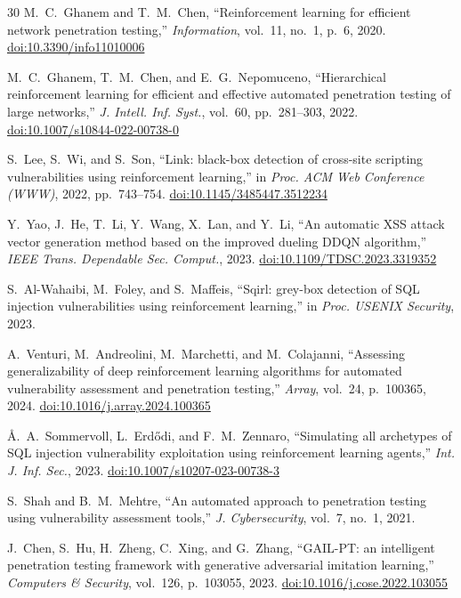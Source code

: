 \documentclass[a4paper,12pt]{article}
\begin{document}
\begin{thebibliography}{30}
 M.~C.~Ghanem and T.~M.~Chen, ``Reinforcement learning for efficient network penetration testing,'' \emph{Information}, vol.~11, no.~1, p.~6, 2020. \href{https://doi.org/10.3390/info11010006}{doi:10.3390/info11010006}

 M.~C.~Ghanem, T.~M.~Chen, and E.~G.~Nepomuceno, ``Hierarchical reinforcement learning for efficient and effective automated penetration testing of large networks,'' \emph{J. Intell. Inf. Syst.}, vol.~60, pp.~281--303, 2022. \href{https://doi.org/10.1007/s10844-022-00738-0}{doi:10.1007/s10844-022-00738-0}

 S.~Lee, S.~Wi, and S.~Son, ``Link: black-box detection of cross-site scripting vulnerabilities using reinforcement learning,'' in \emph{Proc. ACM Web Conference (WWW)}, 2022, pp.~743--754. \href{https://doi.org/10.1145/3485447.3512234}{doi:10.1145/3485447.3512234}

 Y.~Yao, J.~He, T.~Li, Y.~Wang, X.~Lan, and Y.~Li, ``An automatic XSS attack vector generation method based on the improved dueling DDQN algorithm,'' \emph{IEEE Trans. Dependable Sec. Comput.}, 2023. \href{https://doi.org/10.1109/TDSC.2023.3319352}{doi:10.1109/TDSC.2023.3319352}

 S.~Al-Wahaibi, M.~Foley, and S.~Maffeis, ``Sqirl: grey-box detection of SQL injection vulnerabilities using reinforcement learning,'' in \emph{Proc. USENIX Security}, 2023.

 A.~Venturi, M.~Andreolini, M.~Marchetti, and M.~Colajanni, ``Assessing generalizability of deep reinforcement learning algorithms for automated vulnerability assessment and penetration testing,'' \emph{Array}, vol.~24, p.~100365, 2024. \href{https://doi.org/10.1016/j.array.2024.100365}{doi:10.1016/j.array.2024.100365}

 {\AA}.~A.~Sommervoll, L.~Erd{\H o}di, and F.~M.~Zennaro, ``Simulating all archetypes of SQL injection vulnerability exploitation using reinforcement learning agents,'' \emph{Int. J. Inf. Sec.}, 2023. \href{https://doi.org/10.1007/s10207-023-00738-3}{doi:10.1007/s10207-023-00738-3}

 S.~Shah and B.~M.~Mehtre, ``An automated approach to penetration testing using vulnerability assessment tools,'' \emph{J. Cybersecurity}, vol.~7, no.~1, 2021.

 J.~Chen, S.~Hu, H.~Zheng, C.~Xing, and G.~Zhang, ``GAIL-PT: an intelligent penetration testing framework with generative adversarial imitation learning,'' \emph{Computers \& Security}, vol.~126, p.~103055, 2023. \href{https://doi.org/10.1016/j.cose.2022.103055}{doi:10.1016/j.cose.2022.103055}


\end{thebibliography}
\end{document}
